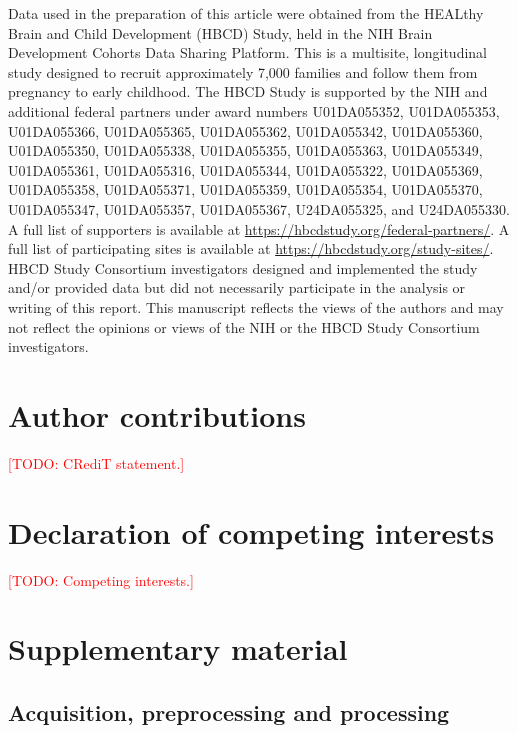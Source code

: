 \documentclass[11pt]{article}
\newcommand{\todo}[1]{\textcolor{red}{[TODO: #1]}}
\begin{document}
Data used in the preparation of this article were obtained from the HEALthy Brain and Child Development (HBCD) Study,
held in the NIH Brain Development Cohorts Data Sharing Platform. This is a multisite, longitudinal study designed to
recruit approximately 7,000 families and follow them from pregnancy to early childhood. The HBCD Study is supported by
the NIH and additional federal partners under award numbers U01DA055352, U01DA055353, U01DA055366, U01DA055365,
U01DA055362, U01DA055342, U01DA055360, U01DA055350, U01DA055338, U01DA055355, U01DA055363, U01DA055349, U01DA055361,
U01DA055316, U01DA055344, U01DA055322, U01DA055369, U01DA055358, U01DA055371, U01DA055359, U01DA055354, U01DA055370,
U01DA055347, U01DA055357, U01DA055367, U24DA055325, and U24DA055330. A full list of supporters is available at
\url{https://hbcdstudy.org/federal-partners/}. A full list of participating sites is available at
\url{https://hbcdstudy.org/study-sites/}. HBCD Study Consortium investigators designed and implemented the study and/or
provided data but did not necessarily participate in the analysis or writing of this report. This manuscript reflects
the views of the authors and may not reflect the opinions or views of the NIH or the HBCD Study Consortium
investigators.

\section*{Author contributions}
\todo{CRediT statement.}

\section*{Declaration of competing interests}
\todo{Competing interests.}




\clearpage
\appendix
\section{Supplementary material}
\setcounter{figure}{0}
\setcounter{table}{0}

\subsection{Acquisition, preprocessing and processing}\label{sec:procdetail}
\end{document}
